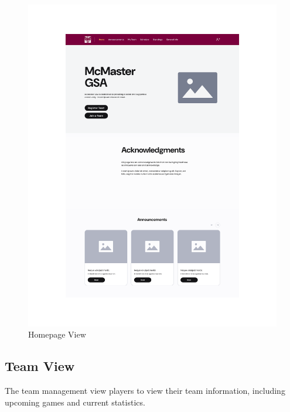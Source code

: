 \documentclass[12pt, titlepage]{article}
\begin{document}
\begin{figure}[H]
  \centering
  \includegraphics[scale=0.7]{LeagueHomeView.pdf}
  \caption{Homepage View}
  \label{fig:homepage_view}
\end{figure}

\newpage

\subsection{Team View}
The team management view players to view their team information, including upcoming games and current statistics.
\end{document}
